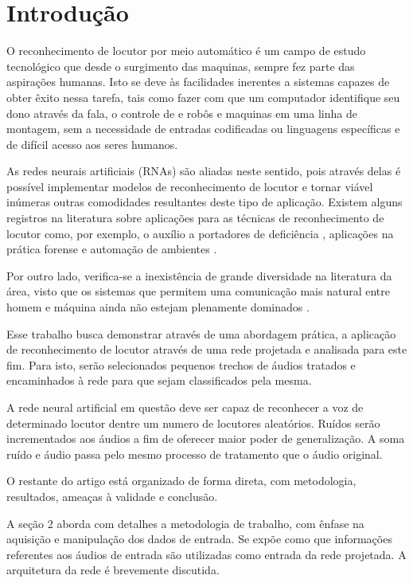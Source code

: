 
\section{Introdução}

\lettrine{O}{} reconhecimento de locutor por meio automático é um campo de estudo
tecnológico que desde o surgimento das maquinas, sempre fez parte das aspirações
humanas. Isto se deve às facilidades inerentes a sistemas capazes de obter êxito
nessa tarefa, tais como fazer com que um computador identifique seu dono através
da fala, o controle de e robôs e maquinas em uma linha de montagem, sem a
necessidade de entradas codificadas ou linguagens específicas e de difícil
acesso aos seres humanos.

As redes neurais artificiais (RNAs) são aliadas neste sentido, pois através
delas é possível implementar modelos de reconhecimento de locutor e tornar
viável inúmeras outras comodidades resultantes deste tipo de aplicação. Existem
alguns registros na literatura sobre aplicações para as técnicas de
reconhecimento de locutor como, por exemplo, o auxílio a portadores de
deficiência \cite{Neto:2010:ReconhecimentoVozCadeiraRodas}
\cite{Thiang:2007:SpeechRecognitionWheelchair}, aplicações na prática forense
\cite{Cardoso:2001:InteligenciaArtificialJudiciario} e automação de ambientes
\cite{Amaral:2004:ReconhecimentoVozAutomaçãoInteligente}.

Por outro lado, verifica-se a inexistência de grande diversidade na literatura
da área, visto que os sistemas que permitem uma comunicação mais natural entre
homem e máquina ainda não estejam plenamente dominados
\cite{Neto:2010:ReconhecimentoVozCadeiraRodas}.

Esse trabalho busca demonstrar através de uma abordagem prática, a aplicação de
reconhecimento de locutor através de uma rede projetada e analisada para este
fim. Para isto, serão selecionados pequenos trechos de áudios tratados e
encaminhados à rede para que sejam classificados pela mesma.

A rede neural artificial em questão deve ser capaz de reconhecer a voz de
determinado locutor dentre um numero de locutores aleatórios. Ruídos serão
incrementados aos áudios a fim de oferecer maior poder de generalização. A soma
ruído e áudio passa pelo mesmo processo de tratamento que o áudio original.

O restante do artigo está organizado de forma direta, com metodologia,
resultados, ameaças à validade e conclusão.

A seção 2 aborda com detalhes a metodologia de trabalho, com ênfase na aquisição
e manipulação dos dados de entrada. Se expõe como que informações referentes aos
áudios de entrada são utilizadas como entrada da rede projetada. A arquitetura
da rede é brevemente discutida.
